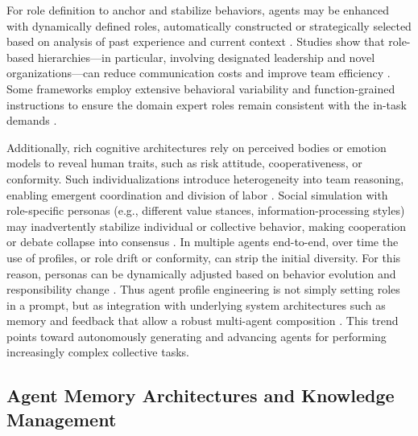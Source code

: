 \documentclass[11pt,a4paper]{article}
\begin{document}
For role definition to anchor and stabilize behaviors, agents may be enhanced with dynamically defined roles, automatically constructed or strategically selected based on analysis of past experience and current context \cite{arxiv:2310.02170v1}. Studies show that role-based hierarchies---in particular, involving designated leadership and novel organizations---can reduce communication costs and improve team efficiency \cite{arxiv:2403.12482v1}. Some frameworks employ extensive behavioral variability and function-grained instructions to ensure the domain expert roles remain consistent with the in-task demands \cite{arxiv:2310.06500v1}.

Additionally, rich cognitive architectures rely on perceived bodies or emotion models to reveal human traits, such as risk attitude, cooperativeness, or conformity. Such individualizations introduce heterogeneity into team reasoning, enabling emergent coordination and division of labor \cite{arxiv:2310.02124v2}. Social simulation with role-specific personas (e.g., different value stances, information-processing styles) may inadvertently stabilize individual or collective behavior, making cooperation or debate collapse into consensus \cite{arxiv:2310.06500v1}. In multiple agents end-to-end, over time the use of profiles, or role drift or conformity, can strip the initial diversity. For this reason, personas can be dynamically adjusted based on behavior evolution and responsibility change \cite{arxiv:2310.02170v1}. Thus agent profile engineering is not simply setting roles in a prompt, but as integration with underlying system architectures such as memory and feedback that allow a robust multi-agent composition \cite{arxiv:2402.01680v2}. This trend points toward autonomously generating and advancing agents for performing increasingly complex collective tasks.


\subsection{Agent Memory Architectures and Knowledge Management}
\end{document}
